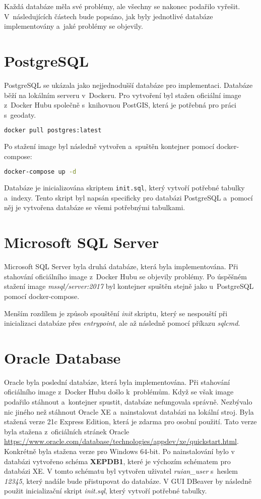 Každá databáze měla své problémy, ale všechny se nakonec podařilo vyřešit.
V~následujících částech bude popsáno, jak byly jednotlivé databáze implementovány a~jaké problémy se objevily.

\section{PostgreSQL}
PostgreSQL se ukázala jako nejjednodušší databáze pro implementaci.
Databáze běží na lokálním serveru v~Dockeru.
Pro vytvoření byl stažen oficiální image z~Docker Hubu
společně s~knihovnou PostGIS, která je potřebná pro práci s~geodaty.

\begin{lstlisting}[language=bash]
docker pull postgres:latest
\end{lstlisting}

Po stažení image byl následně vytvořen a~spuštěn kontejner pomocí docker-compose:

\begin{lstlisting}[language=bash]
docker-compose up -d
\end{lstlisting}

Databáze je inicializována skriptem \texttt{init.sql}, který vytvoří potřebné tabulky a~indexy.
Tento skript byl napsán specificky pro databázi PostgreSQL a~pomocí něj je vytvořena databáze
se všemi potřebnými tabulkami.

\section{Microsoft SQL Server}
Microsoft SQL Server byla druhá databáze, která byla implementována.
Při stahování oficiálního image z~Docker Hubu se objevily problémy.
Po úspěšném stažení image \textit{mssql/server:2017} byl kontejner spuštěn stejně jako u~PostgreSQL
pomocí docker-compose.

Menším rozdílem je způsob spouštění \textit{init} skriptu, který se nespouští při inicializaci databáze
přes \textit{entrypoint}, ale až následně pomocí příkazu \textit{sqlcmd}.

\newpage

\section{Oracle Database}
Oracle byla poslední databáze, která byla implementována.
Při stahování oficiálního image z~Docker Hubu došlo k~problémům.
Když se však image podařilo stáhnout a~kontejner spustit, databáze nefungovala správně.
Nezbývalo nic jiného než stáhnout Oracle XE a~nainstalovat databázi na lokální stroj.
Byla stažená verze 21c Express Edition, která je zdarma pro osobní použití.
Tato verze byla stažena z~oficiálních stránek Oracle
\url{https://www.oracle.com/database/technologies/appdev/xe/quickstart.html}.
Konkrétně byla stažena verze pro Windows 64-bit.
Po nainstalování bylo v databázi vytvořeno schéma \textbf{XEPDB1}, které je výchozím
schématem pro databázi XE. V tomto schématu byl vytvořen uživatel \textit{ruian\_user} s~heslem \textit{12345},
který nadále bude přistupovat do databáze.
V GUI DBeaver by následně použit inicializační skript \textit{init.sql},
který vytvoří potřebné tabulky.


